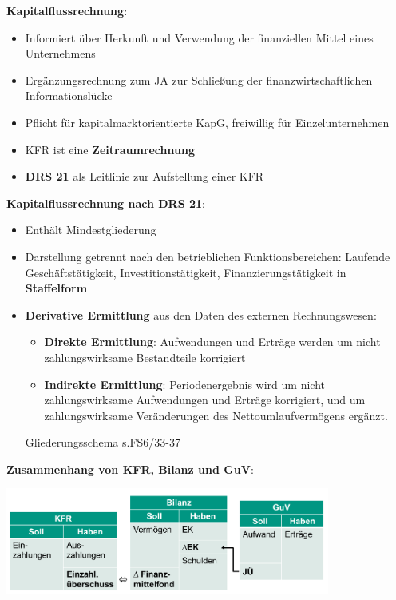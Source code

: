 \textbf{Kapitalflussrechnung}: 
\begin{itemize}
	\item Informiert über Herkunft und Verwendung der finanziellen Mittel eines Unternehmens
	\item Ergänzungsrechnung zum JA zur Schließung der finanzwirtschaftlichen Informationslücke
	\item Pflicht für kapitalmarktorientierte KapG, freiwillig für Einzelunternehmen
	\item KFR ist eine \textbf{Zeitraumrechnung}
	\item \textbf{DRS 21} als Leitlinie zur Aufstellung einer KFR
\end{itemize}

\textbf{Kapitalflussrechnung nach DRS 21}:
\begin{itemize}
	\item Enthält Mindestgliederung
	\item Darstellung getrennt nach den betrieblichen Funktionsbereichen: Laufende Geschäftstätigkeit, Investitionstätigkeit, Finanzierungstätigkeit in \textbf{Staffelform}
	\item \textbf{Derivative Ermittlung} aus den Daten des externen Rechnungswesen:
	\begin{itemize}
		\item \textbf{Direkte Ermittlung}: Aufwendungen und Erträge werden um nicht zahlungswirksame Bestandteile korrigiert
		\item \textbf{Indirekte Ermittlung}: Periodenergebnis wird um nicht zahlungswirksame Aufwendungen und Erträge korrigiert, und um zahlungswirksame Veränderungen des Nettoumlaufvermögens ergänzt.
	\end{itemize}
	Gliederungsschema s.FS6/33-37
\end{itemize}

\textbf{Zusammenhang von KFR, Bilanz und GuV}:
\begin{center}
	\includegraphics[width=0.8\textwidth]{images/kbg.png}
\end{center}

